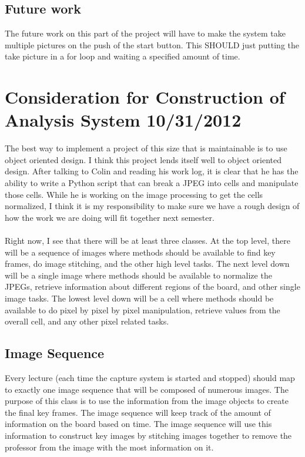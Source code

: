 \documentclass[]{article}
\begin{document}
		\subsection{Future work}
			The future work on this part of the project will have to make the system take multiple pictures on the push of the start button. This SHOULD just putting the take picture in a for loop and waiting a specified amount of time. 
			
	
	\section{Consideration for Construction of Analysis System 10/31/2012}
		The best way to implement a project of this size that is maintainable is to use object oriented design. I think this project lends itself well to object oriented design. After talking to Colin and reading his work log, it is clear that he has the ability to write a Python script that can break a JPEG into cells and manipulate those cells. While he is working on the image processing to get the cells normalized, I think it is my responsibility to make sure we have a rough design of how the work we are doing will fit together next semester. \\
		\\
		Right now, I see that there will be at least three classes. At the top level, there will be a sequence of images where methods should be available to find key frames, do image stitching, and the other high level tasks. The next level down will be a single image where methods should be available to normalize the JPEGs, retrieve information about different regions of the board, and other single image tasks. The lowest level down will be a cell where methods should be available to do pixel by pixel by pixel manipulation, retrieve values from the overall cell, and any other pixel related tasks. 
		
		 \subsection{Image Sequence}
			Every lecture (each time the capture system is started and stopped) should map to exactly one image sequence that will be composed of numerous images. The purpose of this class is to use the information from the image objects to create the final key frames. The image sequence will keep track of the amount of information on the board based on time. The image sequence will use this information to construct key images by stitching images together to remove the professor from the image with the most information on it. 
			
\end{document}

